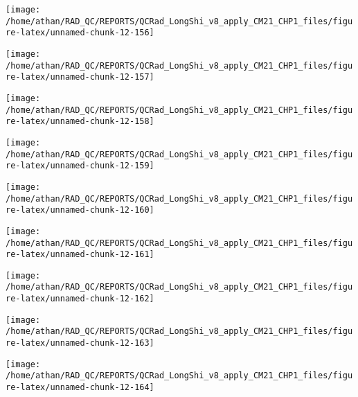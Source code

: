 \documentclass[
  10pt,
  a4paper,oneside]{article}
\begin{document}
\begin{center}\texttt{[image: /home/athan/RAD\_QC/REPORTS/QCRad\_LongShi\_v8\_apply\_CM21\_CHP1\_files/figure-latex/unnamed-chunk-12-156]} \end{center}

\begin{center}\texttt{[image: /home/athan/RAD\_QC/REPORTS/QCRad\_LongShi\_v8\_apply\_CM21\_CHP1\_files/figure-latex/unnamed-chunk-12-157]} \end{center}

\begin{center}\texttt{[image: /home/athan/RAD\_QC/REPORTS/QCRad\_LongShi\_v8\_apply\_CM21\_CHP1\_files/figure-latex/unnamed-chunk-12-158]} \end{center}

\begin{center}\texttt{[image: /home/athan/RAD\_QC/REPORTS/QCRad\_LongShi\_v8\_apply\_CM21\_CHP1\_files/figure-latex/unnamed-chunk-12-159]} \end{center}

\begin{center}\texttt{[image: /home/athan/RAD\_QC/REPORTS/QCRad\_LongShi\_v8\_apply\_CM21\_CHP1\_files/figure-latex/unnamed-chunk-12-160]} \end{center}

\begin{center}\texttt{[image: /home/athan/RAD\_QC/REPORTS/QCRad\_LongShi\_v8\_apply\_CM21\_CHP1\_files/figure-latex/unnamed-chunk-12-161]} \end{center}

\begin{center}\texttt{[image: /home/athan/RAD\_QC/REPORTS/QCRad\_LongShi\_v8\_apply\_CM21\_CHP1\_files/figure-latex/unnamed-chunk-12-162]} \end{center}

\begin{center}\texttt{[image: /home/athan/RAD\_QC/REPORTS/QCRad\_LongShi\_v8\_apply\_CM21\_CHP1\_files/figure-latex/unnamed-chunk-12-163]} \end{center}

\begin{center}\texttt{[image: /home/athan/RAD\_QC/REPORTS/QCRad\_LongShi\_v8\_apply\_CM21\_CHP1\_files/figure-latex/unnamed-chunk-12-164]} \end{center}
\end{document}

